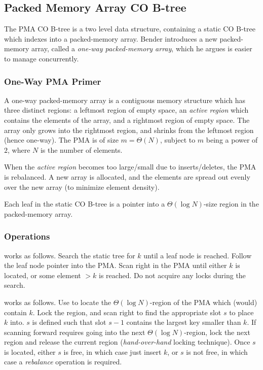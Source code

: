 \documentclass[preprint]{style}
\begin{document}
\subsection{Packed Memory Array CO B-tree}
\label{sec:pma}

The PMA CO B-tree is a two level data structure, containing a static CO B-tree
which indexes into a packed-memory array. Bender introduces a new
packed-memory array, called a \textit{one-way packed-memory array}, which he
argues is easier to manage concurrently.

\subsubsection{One-Way PMA Primer}

A one-way packed-memory array is a contiguous memory structure which has three
distinct regions: a leftmost region of empty space, an \textit{active region}
which contains the elements of the array, and a rightmost region of empty
space. The array only grows into the rightmost region, and shrinks from the
leftmost region (hence one-way). The PMA is of size $m = \Theta(N)$, subject
to $m$ being a power of $2$, where $N$ is the number of elements.

When the \textit{active region} becomes too large/small due to
inserts/deletes, the PMA is rebalanced. A new array is allocated, and the
elements are spread out evenly over the new array (to minimize element
density).

Each leaf in the static CO B-tree is a pointer into a $\Theta(\log N)$-size
region in the packed-memory array.

\subsubsection{Operations}

\Search{} works as follows. Search the static tree for $k$ until a leaf node
is reached. Follow the leaf node pointer into the PMA. Scan right in the PMA
until either $k$ is located, or some element $> k$ is reached. Do not acquire
any locks during the search.

\Insert{} works as follows. Use \Search{} to locate the $\Theta(\log
N)$-region of the PMA which (would) contain $k$. Lock the region, and scan
right to find the appropriate slot $s$ to place $k$ into. $s$ is defined such
that slot $s - 1$ contains the largest key smaller than $k$. If scanning
forward requires going into the next $\Theta(\log N)$-region, lock the next
region and release the current region (\textit{hand-over-hand} locking
technique). Once $s$ is located, either $s$ is free, in which case just insert
$k$, or $s$ is not free, in which case a \textit{rebalance} operation is
required.
\end{document}
